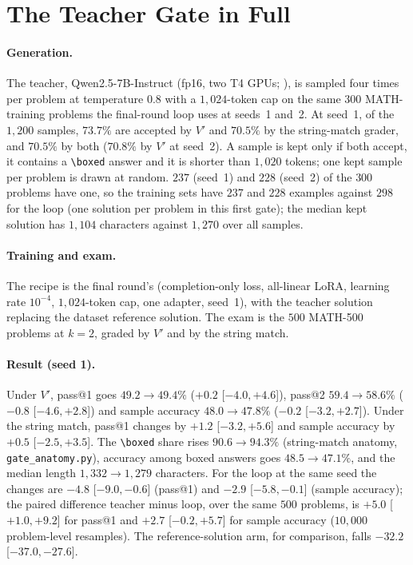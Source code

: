 \documentclass[runningheads]{llncs}
\begin{document}
\section{The Teacher Gate in Full}
\label{app:teacher}

\paragraph{Generation.} The teacher, Qwen2.5-7B-Instruct (fp16, two T4 GPUs; ), is sampled
four times per problem at temperature $0.8$ with a $1{,}024$-token cap on the same $300$ MATH-training problems the final-round
loop uses at seeds~1 and~2. At seed~1, of the $1{,}200$ samples, $73.7\%$ are accepted by $V'$ and $70.5\%$ by the string-match grader, and
$70.5\%$ by both ($70.8\%$ by $V'$ at seed~2). A sample is kept only if both accept, it contains a
\verb|\boxed| answer and it is shorter than $1{,}020$ tokens; one kept sample per problem is drawn at random. $237$ (seed~1) and $228$ (seed~2) of the $300$ problems
have one, so the training sets have $237$ and $228$ examples against $298$ for the loop (one solution per
problem in this first gate); the median kept solution has $1{,}104$ characters against $1{,}270$ over all samples.

\paragraph{Training and exam.} The recipe is the final round's (completion-only loss, all-linear LoRA, learning rate $10^{-4}$,
$1{,}024$-token cap, one adapter, seed~1), with the teacher solution replacing the dataset reference solution. The exam is the $500$
MATH-500 problems at $k=2$, graded by $V'$ and by the string match.

\paragraph{Result (seed 1).} Under $V'$, pass@1 goes $49.2\to49.4\%$ ($+0.2$ [$-4.0,+4.6$]), pass@2 $59.4\to58.6\%$
($-0.8$ [$-4.6,+2.8$]) and sample accuracy $48.0\to47.8\%$ ($-0.2$ [$-3.2,+2.7$]). Under the string match, pass@1 changes by $+1.2$
[$-3.2,+5.6$] and sample accuracy by $+0.5$ [$-2.5,+3.5$]. The \verb|\boxed| share rises $90.6\to94.3\%$ (string-match anatomy,
\texttt{gate\_anatomy.py}), accuracy among boxed answers goes $48.5\to47.1\%$, and the median length $1{,}332\to1{,}279$ characters.
For the loop at the same seed the changes are $-4.8$ [$-9.0,-0.6$] (pass@1) and $-2.9$ [$-5.8,-0.1$] (sample accuracy); the paired
difference teacher minus loop, over the same $500$ problems, is $+5.0$ [$+1.0,+9.2$] for pass@1 and $+2.7$ [$-0.2,+5.7$] for sample
accuracy ($10{,}000$ problem-level resamples). The reference-solution arm, for comparison, falls $-32.2$ [$-37.0,-27.6$].
\end{document}
